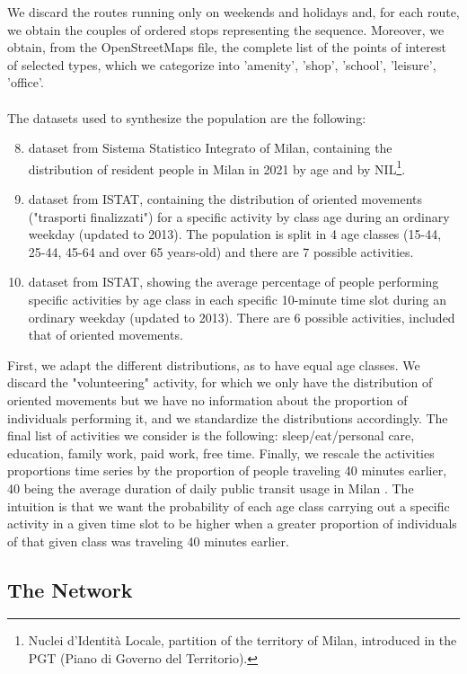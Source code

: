 We discard the routes running only on weekends and holidays and, for each route, we obtain the couples of ordered stops representing the sequence. Moreover, we obtain, from the OpenStreetMaps file, the complete list of the points of interest of selected types, which we categorize into 'amenity', 'shop', 'school', 'leisure', 'office'. \\\\
The datasets used to synthesize the population are the following:
\begin{enumerate}
\setcounter{enumi}{7}
    \item dataset \cite{site18} from Sistema Statistico Integrato of Milan, containing the distribution of resident people in Milan in 2021 by age and by NIL\footnote{Nuclei d'Identità Locale, partition of the territory of Milan, introduced in the PGT (Piano di Governo del Territorio).}.
    \item dataset \cite{site10} from ISTAT, containing the distribution of oriented movements ("trasporti finalizzati") for a specific activity by class age during an ordinary weekday (updated to 2013). The population is split in 4 age classes (15-44, 25-44, 45-64 and over 65 years-old) and there are 7 possible activities.
    \item dataset \cite{site11} from ISTAT, showing the average percentage of people performing specific activities by age class in each specific 10-minute time slot during an ordinary weekday (updated to 2013). There are 6 possible activities, included that of oriented movements.
\end{enumerate}
First, we adapt the different distributions, as to have equal age classes. We discard the "volunteering" activity, for which we only have the distribution of oriented movements but we have no information about the proportion of individuals performing it, and we standardize the distributions accordingly. The final list of activities we consider is the following: sleep/eat/personal care, education, family work, paid work, free time. Finally, we rescale the activities proportions time series by the proportion of people traveling 40 minutes earlier, 40 being the average duration of daily public transit usage in Milan \cite{bib2}. The intuition is that we want the probability of each age class carrying out a specific activity in a given time slot to be higher when a greater proportion of individuals of that given class was traveling 40 minutes earlier.

\subsection{The Network}\label{sec3}

